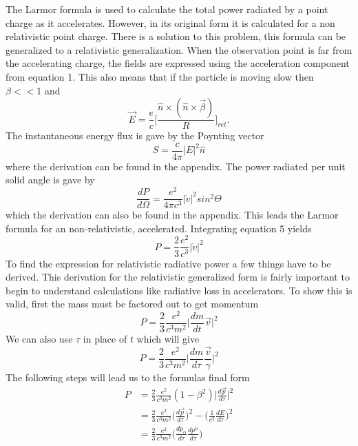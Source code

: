 \documentclass[a4paper]{article}
\begin{document}
The Larmor formula is used to calculate the total power radiated by a point charge as it accelerates. However, in its original form it is calculated for a non relativistic point charge. There is a solution to this problem, this formula can be generalized to a relativistic generalization. When the observation point is far from the accelerating charge, the fields are expressed using the acceleration component from equation 1. This also means that if the particle is moving slow then $\beta << 1$ and
\begin{equation}
\vec{E} = \frac{e}{c} \Bigg[\frac{\hat{n} \times (\hat{n} \times \vec{\beta})}{R}\Bigg]_{ret}.
\end{equation}
The instantaneous energy flux is gave by the Poynting vector
\begin{equation}
    S = \frac{c}{4 \pi} |E|^{2} \hat{n}
\end{equation}
where the derivation can be found in the appendix. The power radiated per unit solid angle is gave by 
\begin{equation}
    \frac{dP}{d \Omega}  = \frac{e^{2}}{4 \pi c^{3}} |\dot{v}|^{2} sin^{2} \Theta
\end{equation}
which the derivation can also be found in the appendix. This leads the Larmor formula for an non-relativistic, accelerated. Integrating equation 5 yields 
\begin{equation}
    P = \frac{2}{3} \frac{e^{2}}{c^{3}} |\dot{v}|^{2}
\end{equation}
To find the expression for relativistic radiative power a few things have to be derived. This derivation for the relativistic generalized form is fairly important to begin to understand calculations like radiative loss in accelerators. To show this is valid, first the mass must be factored out to get momentum
\begin{equation}
    P = \frac{2}{3} \frac{e^{2}}{c^{3}m^{2}} \Big|\frac{dm}{dt}\vec{v}\Big|^{2}
\end{equation}
We can also use $\tau$ in place of $t$ which will give
\begin{equation}
    P = \frac{2}{3} \frac{e^{2}}{c^{3}m^{2}} \Big|\frac{dm}{d\tau} \frac{\vec{v}}{\gamma}\Big|^{2}
\end{equation}
The following steps will lead us to the formulas final form
\begin{align}
    P &= \frac{2}{3} \frac{e^{2}}{c^{3}m^{2}} (1 - \beta^{2}) \Big|\frac{d\vec{p}}{d\tau}\Big|^{2} \\
    &= \frac{2}{3} \frac{e^{2}}{c^{3}m^{2}} \Bigg(\frac{d\vec{p}}{d\tau}\Bigg)^{2} - \Bigg(\frac{1}{c^{2}}\frac{dE}{d\tau}\Bigg)^{2} \\
    &= \frac{2}{3} \frac{e^{2}}{c^{3}m^{2}} \Bigg(\frac{dp_{\alpha}}{d \tau} \frac{dp^{\alpha}}{d \tau}\Bigg)
\end{align}
\end{document}
